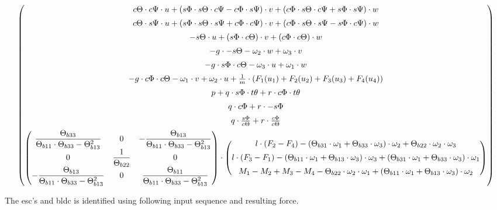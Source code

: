 \begin{align}
\begin{pmatrix}
		c{\Theta} \cdot c{\Psi} \cdot u + (s{\Phi}\cdot s{\Theta} \cdot c{\Psi} - c{\Phi} \cdot s{\Psi}) \cdot v + \left(c{\Phi} \cdot s{\Theta} \cdot c{\Psi} +s{\Phi} \cdot s{\Psi} \right) \cdot w \\[0.5em]
		c{\Theta} \cdot s{\Psi} \cdot u + (s{\Phi} \cdot s{\Theta} \cdot s{\Psi} + c{\Phi} \cdot c{\Psi}) \cdot v + \left( c{\Phi} \cdot s{\Theta} \cdot s{\Psi} - s{\Phi} \cdot c{\Psi} \right) \cdot w \\[0.5em]
		- s{\Theta} \cdot u + \left(s{\Phi} \cdot c{\Theta} \right) \cdot v + \left( c{\Phi} \cdot c{\Theta} \right) \cdot w \\[0.5em]
		-g \cdot - s{\Theta} - \omega_2 \cdot w + \omega_3 \cdot v	\\[0.5em]
		-g \cdot s{\Phi} \cdot c{\Theta} - \omega_3 \cdot u + \omega_1 \cdot w \\[0.5em]
		-g \cdot c{\Phi} \cdot c{\Theta} - \omega_1 \cdot v + \omega_2 \cdot u + \frac{1}{m} \cdot \left( F_1(u_{1}) + F_2(u_{2}) + F_3(u_{3}) + F_4(u_{4}) \right)
		\\[0.5em]
		p + q \cdot s{\Phi}\cdot t{\theta} + r \cdot c{\Phi} \cdot t{\theta} \\[0.5em]
		q \cdot c{\Phi} + r \cdot -s{\Phi} \\[0.5em]
		q \cdot \frac{s{\Phi}}{c{\Theta}} + r \cdot \frac{c{\Phi}}{c{\Theta}} 
		\\[0.5em]
		\begin{pmatrix}
		\dfrac{\Theta_{b33}}{\Theta_{b11} \cdot \Theta_{b33} - \Theta_{b13}^2} & 0 & -\dfrac{\Theta_{b13}}{\Theta_{b11} \cdot \Theta_{b33} - \Theta_{b13}^2} \\
		0  & \dfrac{1}{\Theta_{b22}} & 0 \\
		-\dfrac{\Theta_{b13}}{\Theta_{b11} \cdot \Theta_{b33} - \Theta_{b13}^2} & 0 & \dfrac{\Theta_{b11}}{\Theta_{b11} \cdot \Theta_{b33} - \Theta_{b13}^2}
		\end{pmatrix}
		\cdot 
		\begin{pmatrix} l\cdot(F_2 - F_4) - \left(\Theta_{b31} \cdot \omega_1 + \Theta_{b33} \cdot \omega_3 \right) \cdot \omega_2 + \Theta_{b22} \cdot \omega_2 \cdot \omega_3  
		\\[0.5em]
		l\cdot(F_3 - F_1) - \left(\Theta_{b11} \cdot \omega_1 + \Theta_{b13} \cdot \omega_3 \right) \cdot \omega_3 + \left(\Theta_{b31} \cdot \omega_1 + \Theta_{b33} \cdot \omega_3 \right) \cdot \omega_1 
		\\[0.5em]
		M_1 - M_2 + M_3 - M_4 - \Theta_{b22} \cdot \omega_2 \cdot \omega_1 + \left(\Theta_{b11} \cdot \omega_1 +  \Theta_{b13} \cdot \omega_3 \right) \cdot \omega_2
		\end{pmatrix}
	\end{pmatrix}
\end{align}
\clearpage

The esc's and bldc is identified using following input sequence and resulting force.

